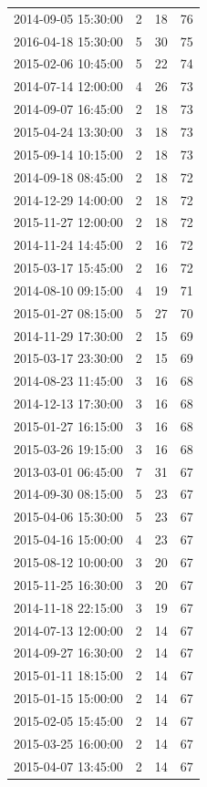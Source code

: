 \begin{tabular}{lrrr}
2014-09-05 15:30:00 & 2 & 18 & 76 \\
2016-04-18 15:30:00 & 5 & 30 & 75 \\
2015-02-06 10:45:00 & 5 & 22 & 74 \\
2014-07-14 12:00:00 & 4 & 26 & 73 \\
2014-09-07 16:45:00 & 2 & 18 & 73 \\
2015-04-24 13:30:00 & 3 & 18 & 73 \\
2015-09-14 10:15:00 & 2 & 18 & 73 \\
2014-09-18 08:45:00 & 2 & 18 & 72 \\
2014-12-29 14:00:00 & 2 & 18 & 72 \\
2015-11-27 12:00:00 & 2 & 18 & 72 \\
2014-11-24 14:45:00 & 2 & 16 & 72 \\
2015-03-17 15:45:00 & 2 & 16 & 72 \\
2014-08-10 09:15:00 & 4 & 19 & 71 \\
2015-01-27 08:15:00 & 5 & 27 & 70 \\
2014-11-29 17:30:00 & 2 & 15 & 69 \\
2015-03-17 23:30:00 & 2 & 15 & 69 \\
2014-08-23 11:45:00 & 3 & 16 & 68 \\
2014-12-13 17:30:00 & 3 & 16 & 68 \\
2015-01-27 16:15:00 & 3 & 16 & 68 \\
2015-03-26 19:15:00 & 3 & 16 & 68 \\
2013-03-01 06:45:00 & 7 & 31 & 67 \\
2014-09-30 08:15:00 & 5 & 23 & 67 \\
2015-04-06 15:30:00 & 5 & 23 & 67 \\
2015-04-16 15:00:00 & 4 & 23 & 67 \\
2015-08-12 10:00:00 & 3 & 20 & 67 \\
2015-11-25 16:30:00 & 3 & 20 & 67 \\
2014-11-18 22:15:00 & 3 & 19 & 67 \\
2014-07-13 12:00:00 & 2 & 14 & 67 \\
2014-09-27 16:30:00 & 2 & 14 & 67 \\
2015-01-11 18:15:00 & 2 & 14 & 67 \\
2015-01-15 15:00:00 & 2 & 14 & 67 \\
2015-02-05 15:45:00 & 2 & 14 & 67 \\
2015-03-25 16:00:00 & 2 & 14 & 67 \\
2015-04-07 13:45:00 & 2 & 14 & 67 \\

\end{tabular}
